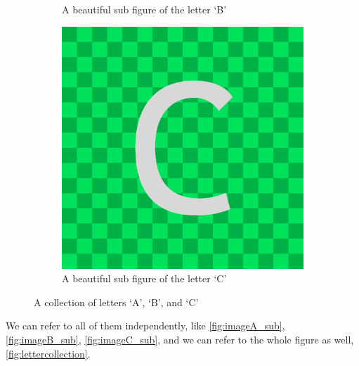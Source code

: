 \documentclass[a4paper, 12pt]{article}
\begin{document}
\begin{figure}[htbp]
\begin{subfigure}{0.48\textwidth}
        \caption{A beautiful sub figure of the letter `B'}
        \label{fig:imageB_sub}
    \end{subfigure}
    
    \begin{subfigure}{0.5\textwidth}
        \centering
        \includegraphics[width=0.98\linewidth]{ ImageC }
        \caption{A beautiful sub figure of the letter `C'}
        \label{fig:imageC_sub}
    \end{subfigure}

    
    \caption{A collection of letters `A', `B', and `C'}
    \label{fig:lettercollection}
\end{figure}

We can refer to all of them independently, like \autoref{fig:imageA_sub}, \autoref{fig:imageB_sub}, \autoref{fig:imageC_sub}, and we can refer to the whole figure as well, \autoref{fig:lettercollection}.
\end{document}
